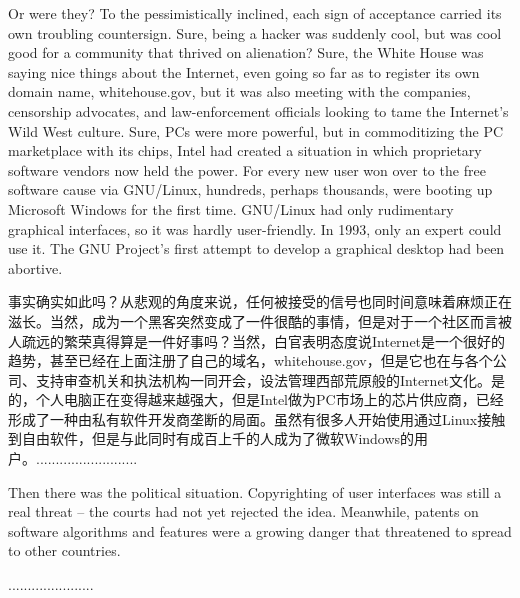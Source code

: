 \ifdefined\eng
Or were they? To the pessimistically inclined, each sign of acceptance carried its own troubling countersign. Sure, being a hacker was suddenly cool, but was cool good for a community that thrived on alienation? Sure, the White House was saying nice things about the Internet, even going so far as to register its own domain name, whitehouse.gov, but it was also meeting with the companies, censorship advocates, and law-enforcement officials looking to tame the Internet's Wild West culture. Sure, PCs were more powerful, but in commoditizing the PC marketplace with its chips, Intel had created a situation in which proprietary software vendors now held the power. For every new user won over to the free software cause via GNU/Linux, hundreds, perhaps thousands, were booting up Microsoft Windows for the first time.  GNU/Linux had only rudimentary graphical interfaces, so it was hardly user-friendly.  In 1993, only an expert could use it.  The GNU Project's first attempt to develop a graphical desktop had been abortive.
\fi

\ifdefined\chs
事实确实如此吗？从悲观的角度来说，任何被接受的信号也同时间意味着麻烦正在滋长。当然，成为一个黑客突然变成了一件很酷的事情，但是对于一个社区而言被人疏远的繁荣真得算是一件好事吗？当然，白官表明态度说Internet是一个很好的趋势，甚至已经在上面注册了自己的域名，whitehouse.gov，但是它也在与各个公司、支持审查机关和执法机构一同开会，设法管理西部荒原般的Internet文化。是的，个人电脑正在变得越来越强大，但是Intel做为PC市场上的芯片供应商，已经形成了一种由私有软件开发商垄断的局面。虽然有很多人开始使用通过Linux接触到自由软件，但是与此同时有成百上千的人成为了微软Windows的用户。..........................
\fi

\ifdefined\eng
Then there was the political situation.  Copyrighting of user interfaces was still a real threat -- the courts had not yet rejected the idea.  Meanwhile, patents on software algorithms and features were a growing danger that threatened to spread to other countries.
\fi

\ifdefined\chs
......................
\fi

